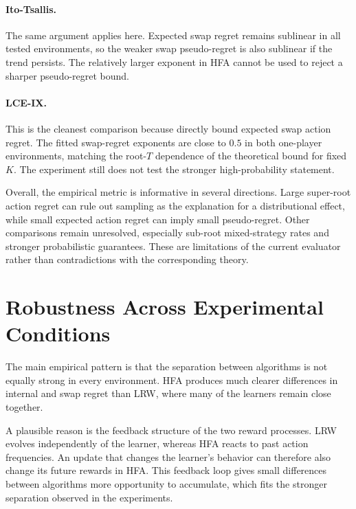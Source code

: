 \paragraph{Ito-Tsallis.}
The same argument applies here. Expected swap regret remains sublinear in all
tested environments, so the weaker swap pseudo-regret is also sublinear if the
trend persists. The relatively larger exponent in HFA cannot be used to reject
a sharper pseudo-regret bound.

\paragraph{LCE-IX.}
This is the cleanest comparison because \citet{huang_near-optimal_2023}
directly bound expected swap action regret. The fitted swap-regret exponents
are close to \(0.5\) in both one-player environments, matching the root-\(T\)
dependence of the theoretical bound for fixed \(K\). The experiment still does
not test the stronger high-probability statement.

Overall, the empirical metric is informative in several directions. Large
super-root action regret can rule out sampling as the explanation for a
distributional effect, while small expected action regret can imply small
pseudo-regret. Other comparisons remain unresolved, especially sub-root
mixed-strategy rates and stronger probabilistic guarantees. These are
limitations of the current evaluator rather than contradictions with the
corresponding theory.

\section{Robustness Across Experimental Conditions}
\label{sec:discussion-robustness}

The main empirical pattern is that the separation between algorithms is not
equally strong in every environment. HFA produces much clearer differences in
internal and swap regret than LRW, where many of the learners remain close
together.

A plausible reason is the feedback structure of the two reward processes. LRW
evolves independently of the learner, whereas HFA reacts to past action
frequencies. An update that changes the learner's behavior can therefore also
change its future rewards in HFA. This feedback loop gives small differences
between algorithms more opportunity to accumulate, which fits the stronger
separation observed in the experiments.

